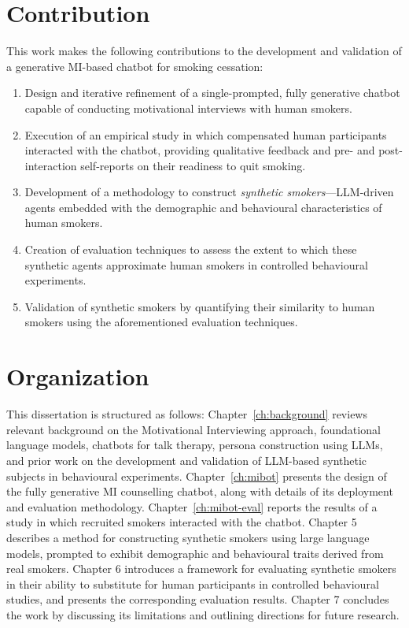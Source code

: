 \section{Contribution}

This work makes the following contributions to the development and validation of a generative MI-based chatbot for smoking cessation:

\begin{enumerate}
    \item Design and iterative refinement of a single-prompted, fully generative chatbot capable of conducting motivational interviews with human smokers.
    
    \item Execution of an empirical study in which compensated human participants interacted with the chatbot, providing qualitative feedback and pre- and post-interaction self-reports on their readiness to quit smoking. 
    
    \item Development of a methodology to construct \emph{synthetic smokers}—LLM-driven agents embedded with the demographic and behavioural characteristics of human smokers.
    
    \item Creation of evaluation techniques to assess the extent to which these synthetic agents approximate human smokers in controlled behavioural experiments.
    
    \item Validation of synthetic smokers by quantifying their similarity to human smokers using the aforementioned evaluation techniques. 
    
\end{enumerate}

\section{Organization}

This dissertation is structured as follows: Chapter~\ref{ch:background} reviews relevant background on the Motivational Interviewing approach, foundational language models, chatbots for talk therapy, persona construction using LLMs, and prior work on the development and validation of LLM-based synthetic subjects in behavioural experiments. Chapter~\ref{ch:mibot} presents the design of the fully generative MI counselling chatbot, along with details of its deployment and evaluation methodology. Chapter~\ref{ch:mibot-eval} reports the results of a study in which recruited smokers interacted with the chatbot. Chapter 5 describes a method for constructing synthetic smokers using large language models, prompted to exhibit demographic and behavioural traits derived from real smokers. Chapter 6 introduces a framework for evaluating synthetic smokers in their ability to substitute for human participants in controlled behavioural studies, and presents the corresponding evaluation results. Chapter 7 concludes the work by discussing its limitations and outlining directions for future research.
